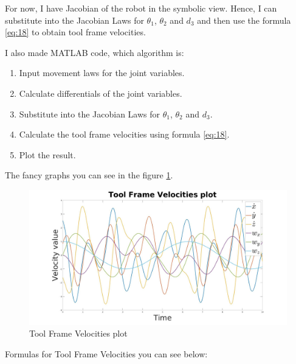 \documentclass[12pt, a4paper]{report}
\begin{document}
For now, I have Jacobian of the robot in the symbolic view. Hence, I can substitute into the Jacobian Laws for $\theta_1$, $\theta_2$ and $d_3$ and then use the formula \ref{eq:18} to obtain tool frame velocities.

I also made MATLAB code, which algorithm is:
\begin{enumerate}
	\item Input movement laws for the joint variables.
	\item Calculate differentials of the joint variables.
	\item Substitute into the Jacobian Laws for $\theta_1$, $\theta_2$ and $d_3$.
	\item Calculate the tool frame velocities using formula \ref{eq:18}.
	\item Plot the result.	
\end{enumerate}

The fancy graphs you can see in the figure \ref{fig:mesh10}.

\begin{figure}[H]
	\centering
		\includegraphics[width=1.0\textwidth]{Image10} %
	\caption{Tool Frame Velocities plot} %
	\label{fig:mesh10}
\end{figure}

Formulas for Tool Frame Velocities you can see below:
\end{document}
